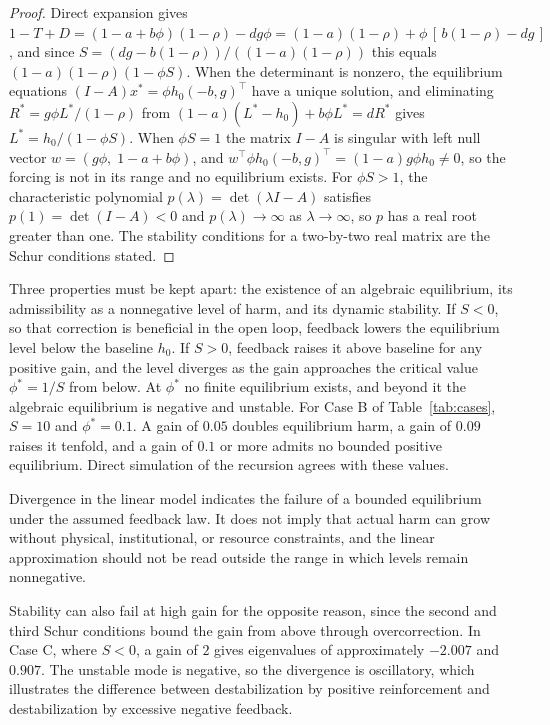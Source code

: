 \documentclass[12pt]{article}
\theoremstyle{remark}
\begin{document}
\begin{proof}
Direct expansion gives $1 - T + D = (1 - a + b\phi)(1-\rho) - dg\phi = (1-a)(1-\rho) + \phi\,[\,b(1-\rho) - dg\,]$, and since $S = (dg - b(1-\rho))/((1-a)(1-\rho))$ this equals $(1-a)(1-\rho)(1 - \phi S)$. When the determinant is nonzero, the equilibrium equations $(I - A)x^{*} = \phi h_0 (-b, g)^{\top}$ have a unique solution, and eliminating $R^{*} = g\phi L^{*}/(1-\rho)$ from $(1-a)(L^{*} - h_0) + b\phi L^{*} = dR^{*}$ gives $L^{*} = h_0/(1 - \phi S)$. When $\phi S = 1$ the matrix $I - A$ is singular with left null vector $w = (g\phi,\; 1 - a + b\phi)$, and $w^{\top}\phi h_0(-b, g)^{\top} = (1-a) g \phi h_0 \ne 0$, so the forcing is not in its range and no equilibrium exists. For $\phi S > 1$, the characteristic polynomial $p(\lambda) = \det(\lambda I - A)$ satisfies $p(1) = \det(I - A) < 0$ and $p(\lambda) \to \infty$ as $\lambda \to \infty$, so $p$ has a real root greater than one. The stability conditions for a two-by-two real matrix are the Schur conditions stated.
\end{proof}

Three properties must be kept apart: the existence of an algebraic equilibrium, its admissibility as a nonnegative level of harm, and its dynamic stability. If $S < 0$, so that correction is beneficial in the open loop, feedback lowers the equilibrium level below the baseline $h_0$. If $S > 0$, feedback raises it above baseline for any positive gain, and the level diverges as the gain approaches the critical value $\phi^{*} = 1/S$ from below. At $\phi^{*}$ no finite equilibrium exists, and beyond it the algebraic equilibrium is negative and unstable. For Case B of Table~\ref{tab:cases}, $S = 10$ and $\phi^{*} = 0.1$. A gain of $0.05$ doubles equilibrium harm, a gain of $0.09$ raises it tenfold, and a gain of $0.1$ or more admits no bounded positive equilibrium. Direct simulation of the recursion agrees with these values.

Divergence in the linear model indicates the failure of a bounded equilibrium under the assumed feedback law. It does not imply that actual harm can grow without physical, institutional, or resource constraints, and the linear approximation should not be read outside the range in which levels remain nonnegative.

Stability can also fail at high gain for the opposite reason, since the second and third Schur conditions bound the gain from above through overcorrection. In Case C, where $S < 0$, a gain of $2$ gives eigenvalues of approximately $-2.007$ and $0.907$. The unstable mode is negative, so the divergence is oscillatory, which illustrates the difference between destabilization by positive reinforcement and destabilization by excessive negative feedback.
\end{document}
